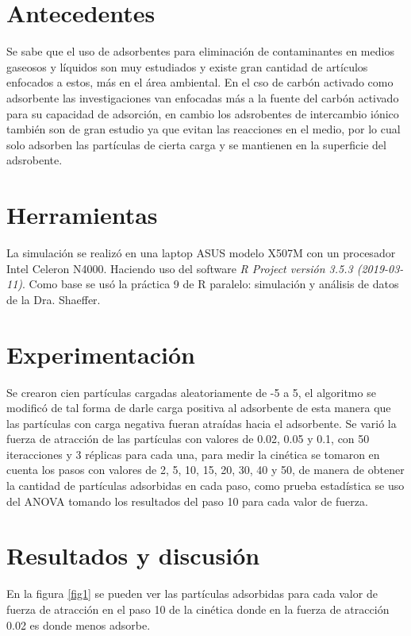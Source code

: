 \documentclass[12pt, letterpaper] {article}
\begin{document}
\section{Antecedentes}
Se sabe que el uso de adsorbentes para eliminación de contaminantes en medios gaseosos y líquidos son muy estudiados y existe gran cantidad de artículos enfocados a estos, más en el área ambiental\cite{art2}. En el cso de carbón activado como adsorbente las investigaciones van enfocadas más a la fuente del carbón activado para su capacidad de adsorción, en cambio los adsrobentes de intercambio iónico también son de gran estudio ya que evitan las reacciones en el medio, por lo cual solo adsorben las partículas de cierta carga y se mantienen en la superficie del adsrobente.


\section{Herramientas}
La simulación se realizó en una laptop ASUS modelo X507M con un procesador Intel Celeron N4000. Haciendo uso del software \textit{R Project versión 3.5.3 (2019-03-11)}. Como base se usó la práctica 9 \cite{} de R paralelo: simulación y análisis de datos de la Dra. Shaeffer. 

\section{Experimentación}
Se crearon cien partículas cargadas aleatoriamente de -5 a 5, el algoritmo se modificó de tal forma de darle carga positiva al adsorbente de esta manera que las partículas con carga negativa fueran atraídas hacia el adsorbente. Se varió la fuerza de atracción de las partículas con valores de 0.02, 0.05 y 0.1, con 50 iteracciones y 3 réplicas para cada una, para medir la cinética se tomaron en cuenta los pasos con valores de 2, 5, 10, 15, 20, 30, 40 y 50, de manera de obtener la cantidad de partículas adsorbidas en cada paso, como prueba estadística se uso del ANOVA tomando los resultados del paso 10 para cada valor de fuerza.

 
\section{Resultados y discusión}
En la figura \ref{fig1} se pueden ver las partículas adsorbidas para cada valor de fuerza de atracción en el paso 10 de la cinética donde en la fuerza de atracción 0.02 es donde menos adsorbe.
\end{document}
